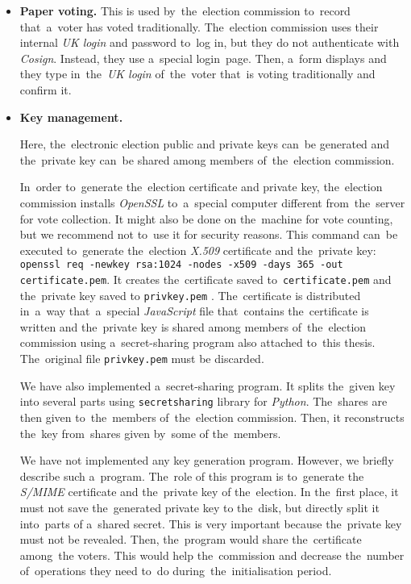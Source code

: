 \begin{itemize}
\item \textbf{Paper voting.} This is used by~the~election commission to~record that~a~voter has voted traditionally. The~election commission uses their internal \emph{UK login} and password to~log in, but they do not authenticate with \emph{Cosign}. Instead, they use a~special login~page. Then, a~form displays and they type in~the~\emph{UK login} of~the~voter that~is voting traditionally and confirm it.
\item \textbf{Key management.}{ Here, the~electronic election public and private keys can~be generated and the~private key can~be shared among members of~the~election commission. 

In~order to~generate the~election certificate and private key, the~election commission installs \emph{OpenSSL} to~a~special computer different from~the~server for vote collection. It might also be done on the~machine for vote counting, but we recommend not to~use it for security reasons. This command can~be executed to~generate the~election \emph{X.509} certificate and the~private key: \texttt{openssl req -newkey rsa:1024 -nodes -x509 -days 365 -out certificate.pem}. It creates the~certificate saved to~\texttt{certificate.pem} and the~private key saved to \texttt{privkey.pem} \cite{M2Crypto}. The~certificate is distributed in~a~way that~a~special \emph{JavaScript} file that~contains the~certificate is written and the~private key is shared among members of~the~election commission using a~secret-sharing program also attached to~this thesis. The~original file \texttt{privkey.pem} must be discarded.}

We have also implemented a~secret-sharing program. It splits the~given key into several parts using \texttt{secretsharing} library for \emph{Python}. The~shares are then given to~the~members of~the~election commission. Then, it reconstructs the~key from~shares given by~some of the~members.

We have not implemented any key generation program. However, we briefly describe such a~program. The~role of this program is to~generate the \emph{S/MIME} certificate and the~private key of the~election. In the~first place, it must not save the~generated private key to the~disk, but directly split it into~parts of a~shared secret. This is very important because the~private key must not be revealed. Then, the~program would share the~certificate among~the voters. This would help the~commission and decrease the~number of~operations they need to~do during~the~initialisation period.


\end{itemize}
